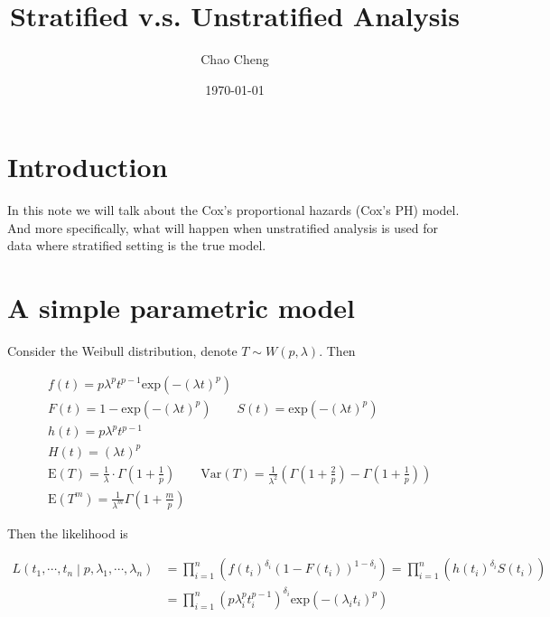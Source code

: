 \documentclass[a4paper,12pt]{article}
\title{Stratified v.s. Unstratified Analysis}
\author{Chao Cheng}
\date{\today}
\begin{document}
\maketitle
\tableofcontents{}

\section{Introduction}
\label{sec:introduction}

In this note we will talk about the Cox's proportional hazards (Cox's PH) model. And more specifically, what will happen when unstratified analysis is used for data where stratified setting is the true model. 

\section{A simple parametric model}
\label{sec:simple-param-model}

Consider the Weibull distribution, denote $T \sim W(p, \lambda)$. Then

\[
  \begin{aligned}
    & f\left(t\right) = p\lambda^pt^{p - 1}\mathrm{exp}\left(-\left(\lambda t\right)^p\right)    \\
    & F\left(t\right) = 1 - \mathrm{exp}\left(-\left(\lambda t\right)^p\right)
      \quad\quad S\left(t\right) = \mathrm{exp}\left(-\left(\lambda t\right)^p\right)    \\
    & h\left(t\right) = p\lambda^pt^{p - 1}    \\
    & H\left(t\right) = \left(\lambda t\right)^p    \\
    & \mathrm{E}\left(T\right) = \frac{1}{\lambda} \cdot \Gamma\left(1 + \frac{1}{p}\right)
      \quad\quad \mathrm{Var}\left(T\right) = \frac{1}{\lambda^2}\left(
      \Gamma\left(1 + \frac{2}{p}\right)
      - \Gamma\left(1 + \frac{1}{p}\right)
      \right)    \\
    & \mathrm{E}\left(T^m\right) = \frac{1}{\lambda^m}\Gamma\left(1 + \frac{m}{p}\right)
  \end{aligned}
\]

Then the likelihood is

\begin{equation}
  \label{eq:weibull_likelihood}
  \begin{aligned}
    L\left(t_1, \cdots, t_n\middle|p, \lambda_1, \cdots, \lambda_n\right)
    &= \prod\limits_{i = 1}^n\left(
    f(t_i)^{\delta_i}\left(1 - F\left(t_i\right)\right)^{1 - \delta_i}
    \right)
    = \prod\limits_{i = 1}^n\left(
    h\left(t_i\right)^{\delta_i}S\left(t_i\right)
    \right)    \\
    &= \prod\limits_{i = 1}^n
      \left(p\lambda_i^{p}t_i^{p - 1}\right)^{\delta_i}
      \mathrm{exp}\left(-\left(\lambda_i t_i\right)^p\right)
  \end{aligned}
\end{equation}
\end{document}
